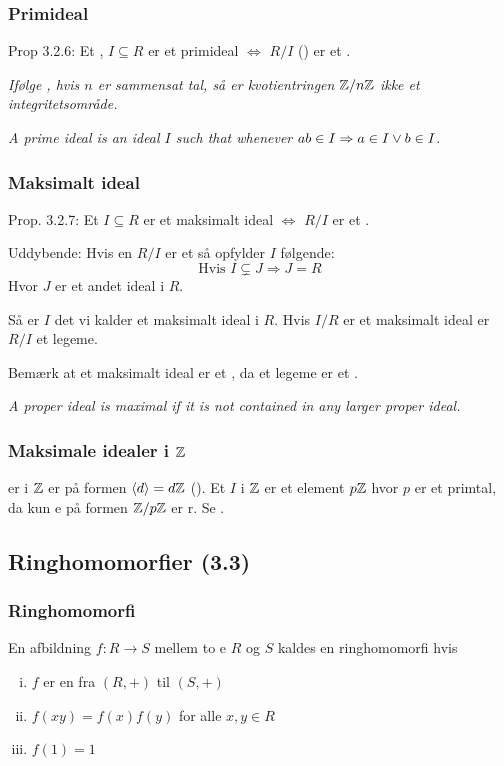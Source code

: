 \subsubsection{Primideal}
\label{Primideal}
Prop 3.2.6: Et , $I \subseteq R$ er et primideal $\iff$
$R/I$ () er et .

\textit{Ifølge , hvis $n$ er sammensat tal, så er
kvotientringen $\mathbb{Z}/n\mathbb{Z}$ ikke et integritetsområde.}

\textit{A prime ideal is an ideal $I$ such that whenever $ab \in I \Rightarrow
a \in I \vee b \in I$.}

\subsubsection{Maksimalt ideal}
\label{Maksimalt ideal}
Prop. 3.2.7: Et  $I \subseteq R$ er et maksimalt ideal $\iff$
$R/I$ er et .

Uddybende: Hvis en $R/I$ er et  så
opfylder $I$ følgende:
\begin{equation*}
  \text{Hvis } I \subsetneq J \Rightarrow J = R
\end{equation*}
Hvor $J$ er et andet ideal i $R$.

Så er $I$ det vi kalder et maksimalt ideal i $R$. Hvis $I/R$ er et maksimalt
ideal er $R/I$ et legeme.

Bemærk at et maksimalt ideal er et , da et legeme er et
.

\textit{A proper ideal is maximal if it is not contained in any larger proper
ideal.}

\subsubsection{Maksimale idealer i $\mathbb{Z}$}
\label{Maksimale idealer i Z}
er i $\mathbb{Z}$ er på formen $\langle d \rangle = d\mathbb{Z}$
(). Et  $I$ i $\mathbb{Z}$ er et
element $p\mathbb{Z}$ hvor $p$ er et primtal, da kun e på
formen $\mathbb{Z}/p\mathbb{Z}$ er r. Se .


\subsection{Ringhomomorfier (3.3)}
\subsubsection{Ringhomomorfi}
\label{Ringhomomorfi}
En afbildning $f: R \rightarrow S$ mellem to e $R$ og $S$ kaldes
en ringhomomorfi hvis
\begin{enumerate}[(i)]
  \item $f$ er en  fra $(R, +)$ til $(S,+)$
  \item $f(xy) = f(x)f(y)$ for alle $x,y \in R$
  \item $f(1) = 1$
\end{enumerate}

